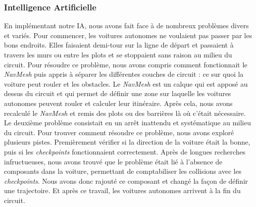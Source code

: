 \documentclass[a4paper,12pt]{article}
\newcommand{\AI}{Intelligence Artificielle}
\begin{document}
            \subsubsection{\AI}
                En implémentant notre IA, nous avons fait face à de nombreux problèmes divers et variés. Pour 
                commencer, les voitures autonomes ne voulaient pas passer par les bons endroits. Elles 
                faisaient demi-tour sur la ligne de départ et passaient à travers les murs ou entre les 
                plots et se stoppaient sans raison au milieu du circuit. Pour résoudre ce problème, nous
                avons compris comment fonctionnait le \textit{NavMesh} puis appris à séparer les 
                différentes couches de circuit : ce sur quoi la voiture peut rouler et les obstacles. Le 
                \textit{NavMesh} est un calque qui est apposé au dessus du circuit et qui permet de
                définir une zone sur laquelle les voitures autonomes peuvent rouler et calculer leur
                itinéraire. Après cela, nous avons recalculé le \textit{NavMesh} et remis des plots
                ou des barrières là où c'était nécessaire.\\
                Le deuxième problème consistait en un arrêt inattendu et systématique au milieu du 
                circuit. Pour trouver comment résoudre ce problème, nous avons exploré plusieurs pistes. Premièrement vérifier si la direction de la voiture était la bonne, puis si les 
                \textit{checkpoints} fonctionnaient correctement. Après de longues recherches 
                infructueuses, nous avons trouvé que le problème était lié à l'absence de composants 
                dans la voiture, permettant de comptabiliser les collisions avec les 
                \textit{checkpoints}. Nous avons donc rajouté ce composant et changé la façon de définir
                une trajectoire. Et après ce travail, les voitures autonomes arrivent à la fin du 
                circuit.
\end{document}
